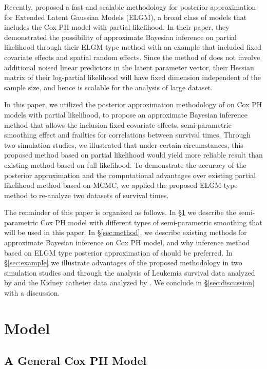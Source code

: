 \documentclass[ba]{imsart}
\begin{document}
Recently, \cite{ELGM} proposed a fast and scalable methodology for posterior approximation for Extended Latent Gaussian Models (ELGM), a broad class of models that includes the Cox PH model with partial likelihood. In their paper, they demonstrated the possibility of approximate Bayesian inference on partial likelihood through their ELGM type method with an example that included fixed covariate effects and spatial random effects. Since the method of \cite{ELGM} does not involve additional noised linear predictors in the latent parameter vector, their Hessian matrix of their log-partial likelihood will have fixed dimension independent of the sample size, and hence is scalable for the analysis of large dataset. 

In this paper, we utilized the posterior approximation methodology of \cite{ELGM} on Cox PH models with partial likelihood, to propose an approximate Bayesian inference method that allows the inclusion fixed covariate effects, semi-parametric smoothing effect and frailties for correlations between survival times. Through two simulation studies, we illustrated that under certain circumstances, this proposed method based on partial likelihood would yield more reliable result than existing method based on full likelihood. To demonstrate the accuracy of the posterior approximation and the computational advantages over existing partial likelihood method based on MCMC, we applied the proposed ELGM type method to re-analyze two datasets of survival times.

The remainder of this paper is organized as follows. In \S\ref{sec:model} we describe the semi-parametric Cox PH model with different types of semi-parametric smoothing that will be used in this paper. In \S\ref{sec:method}, we describe existing methods for approximate Bayesian inference on Cox PH model, and why inference method based on ELGM type posterior approximation of \cite{ELGM} should be preferred. In \S\ref{sec:example} we illustrate advantages of the proposed methodology in two simulation studies and through the analysis of Leukemia survival data analyzed by \cite{inlacoxph} and the Kidney catheter data analyzed by \cite{kidney}. We conclude in \S\ref{sec:discussion} with a discussion.

\section{Model}\label{sec:model}

\subsection{A General Cox PH Model}
\end{document}
